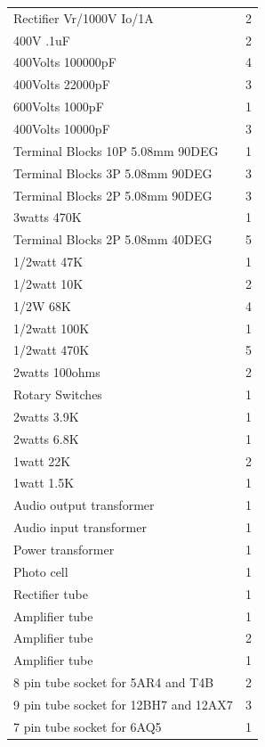 \documentclass[journal]{IEEEtran}
\begin{document}
\begin{table}[]
\begin{tabular}{l|l}
			Rectifier Vr/1000V Io/1A              & 2          \\
			400V .1uF                             & 2          \\
			400Volts 100000pF                     & 4          \\
			400Volts 22000pF                      & 3          \\
			600Volts 1000pF                       & 1          \\
			400Volts 10000pF                      & 3          \\
			Terminal Blocks 10P 5.08mm 90DEG      & 1          \\
			Terminal Blocks 3P 5.08mm 90DEG       & 3          \\
			Terminal Blocks 2P 5.08mm 90DEG       & 3          \\
			3watts 470K                           & 1          \\
			Terminal Blocks 2P 5.08mm 40DEG       & 5          \\
			1/2watt 47K                           & 1          \\
			1/2watt 10K                           & 2          \\
			1/2W 68K                              & 4          \\
			1/2watt 100K                          & 1          \\
			1/2watt 470K                          & 5          \\
			2watts 100ohms                        & 2          \\
			Rotary Switches                       & 1          \\
			2watts 3.9K                           & 1          \\
			2watts 6.8K                           & 1          \\
			1watt 22K                             & 2          \\
			1watt 1.5K                            & 1          \\
			Audio output transformer              & 1          \\
			Audio input transformer               & 1          \\
			Power transformer                     & 1          \\
			Photo cell                            & 1          \\
			Rectifier tube                        & 1          \\
			Amplifier tube                        & 1          \\
			Amplifier tube                        & 2          \\
			Amplifier tube                        & 1          \\
			8 pin tube socket for 5AR4 and T4B    & 2          \\
			9 pin tube socket for 12BH7 and 12AX7 & 3          \\
			7 pin tube socket for 6AQ5            & 1         
		\end{tabular}
	\end{table}
	
\end{document}
